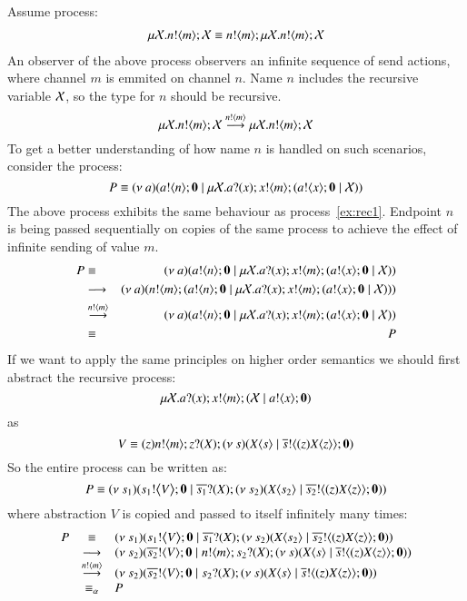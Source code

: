 \begin{example}
	Assume process:
%
	\begin{eqnarray}
		\label{ex:rec1}
		\mu \mathcal{X}. n ! \langle m \rangle ; \mathcal{X} \equiv n ! \langle m \rangle ; \mu \mathcal{X}. n ! \langle m \rangle ; \mathcal{X} 
	\end{eqnarray}
%
	\noi An observer of the above process observers an infinite sequence
	of send actions, where channel $m$ is emmited on channel $n$.
	Name $n$ includes the recursive
	variable $\mathcal{X}$, so the type for $n$ should be recursive.
%
	\[
		\mu \mathcal{X}. n ! \langle m \rangle ; \mathcal{X} \stackrel{n ! \langle m \rangle}{\longrightarrow} \mu \mathcal{X}. n ! \langle m \rangle ; \mathcal{X}
	\]
%
	To get a better understanding of how name $n$ is handled
	on such scenarios, consider the process:
	\[
		P \equiv (\nu\ a)(a ! \langle n \rangle ; \mathbf{0} \;|\; \mu \mathcal{X}. a ? (x) ; x ! \langle m \rangle ; (a ! \langle x \rangle ; \mathbf{0} \;|\; \mathcal{X}))
	\]
%
	\noi The above process exhibits the same behaviour as
	process~\ref{ex:rec1}.
	Endpoint $n$ is being passed sequentially on copies of the 
	same process to achieve the effect of infinite sending of value $m$.
%
	\begin{eqnarray*}
		P	&\equiv&	(\nu\ a)(a ! \langle n \rangle ; \mathbf{0} \;|\; \mu \mathcal{X}. a ? (x) ; x ! \langle m \rangle ; (a ! \langle x \rangle ; \mathbf{0} \;|\; \mathcal{X}))\\
			&\longrightarrow&		(\nu\ a)(n ! \langle m \rangle ; (a ! \langle n \rangle ; \mathbf{0} \;|\; \mu \mathcal{X}. a ? (x) ; x ! \langle m \rangle ; (a ! \langle x \rangle ; \mathbf{0} \;|\; \mathcal{X})))\\
			&\stackrel{n ! \langle m \rangle}{\longrightarrow}& (\nu\ a)(a ! \langle n \rangle ; \mathbf{0} \;|\; \mu \mathcal{X}. a ? (x) ; x ! \langle m \rangle ; (a ! \langle x \rangle ; \mathbf{0} \;|\; \mathcal{X}))\\
			&\equiv&	P
	\end{eqnarray*}
%
	\noi If we want to apply the same principles on higher order semantics we should first
	abstract the recursive process:
%
	\[
		\mu \mathcal{X}. a ? (x) ; x ! \langle m \rangle ; ( \mathcal{X} \;|\; a ! \langle x \rangle ; \mathbf{0})
	\]
%
	\noi as
%
	\[
		V \equiv (z) n ! \langle m \rangle ; z ? (X) ; (\nu\ s)(X\langle s \rangle \;|\; \overline{s} ! \langle (z) X\langle z \rangle \rangle ; \mathbf{0})
	\]
%
	So the entire process can be written as:
	\[
		P \equiv (\nu\ s_1)(s_1 ! \big\langle V \big\rangle ; \mathbf{0} \;|\; \overline{s_1} ? (X) ; (\nu\ s_2)(X\langle s_2 \rangle \;|\; \overline{s_2} ! \langle (z) X\langle z \rangle \rangle ; \mathbf{0}))	
	\]
%
	\noi where abstraction $V$ is copied and passed to itself
	infinitely many times:
	\[
		\begin{array}{rcl}
			P &\equiv& (\nu\ s_1)(s_1 ! \big\langle V \big\rangle ; \mathbf{0} \;|\; \overline{s_1} ? (X) ; (\nu\ s_2)(X\langle s_2 \rangle \;|\; \overline{s_2} ! \langle (z) X\langle z \rangle \rangle ; \mathbf{0})) \\
			&\longrightarrow&
			(\nu\ s_2)(\overline{s_2} ! \langle V \rangle ; \mathbf{0} \;|\; n ! \langle m \rangle ; s_2 ? (X) ; (\nu\ s)(X\langle s \rangle \;|\; \overline{s} ! \langle (z) X\langle z \rangle \rangle ; \mathbf{0}))\\
			&\stackrel{n ! \langle m \rangle}{\longrightarrow}&
			(\nu\ s_2)(\overline{s_2} ! \langle V \rangle ; \mathbf{0} \;|\; s_2 ? (X) ; (\nu\ s)(X\langle s \rangle \;|\; \overline{s} ! \langle (z) X\langle z \rangle \rangle ; \mathbf{0}))\\
			&\equiv_\alpha&
			P
		\end{array}
	\]
%


\end{example}
